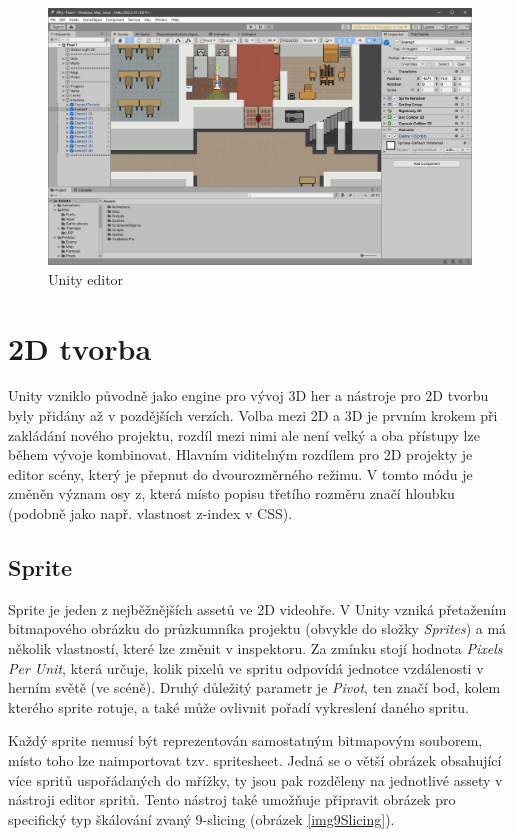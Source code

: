 \documentclass[FM,Proj,bw]{tulthesis}
\begin{document}
	\begin{figure}[ht]
		\centering
		\includegraphics[width=\textwidth]{img/UnityEditor}
		\caption{Unity editor}
	\end{figure}
	
	\section{2D tvorba}
	
	Unity vzniklo původně jako engine pro vývoj 3D her a nástroje pro 2D tvorbu byly přidány až v pozdějších verzích. Volba mezi 2D a 3D je prvním krokem při zakládání nového projektu, rozdíl mezi nimi ale není velký a oba přístupy lze během vývoje kombinovat. Hlavním viditelným rozdílem pro 2D projekty je editor scény, který je přepnut do dvourozměrného režimu. V tomto módu je změněn význam osy z, která místo popisu třetího rozměru značí hloubku (podobně jako např. vlastnost z-index v CSS). \cite{Unity2DAnnouncement}
	
	\subsection{Sprite} %
	
	Sprite je jeden z nejběžnějších assetů ve 2D videohře. V Unity vzniká přetažením bitmapového obrázku do průzkumníka projektu (obvykle do složky \textit{Sprites}) a má několik vlastností, které lze změnit v inspektoru. Za zmínku stojí hodnota \textit{Pixels Per Unit}, která určuje, kolik pixelů ve spritu odpovídá jednotce vzdálenosti v herním světě (ve scéně). Druhý důležitý parametr je \textit{Pivot}, ten značí bod, kolem kterého sprite rotuje, a také může ovlivnit pořadí vykreslení daného spritu.
	
	Každý sprite nemusí být reprezentován samostatným bitmapovým souborem, místo toho lze naimportovat tzv. spritesheet. Jedná se o větší obrázek obsahující více spritů uspořádaných do mřížky, ty jsou pak rozděleny na jednotlivé assety v nástroji editor spritů. Tento nástroj také umožňuje připravit obrázek pro specifický typ škálování zvaný 9-slicing (obrázek \ref{img9Slicing}).
	
\end{document}
